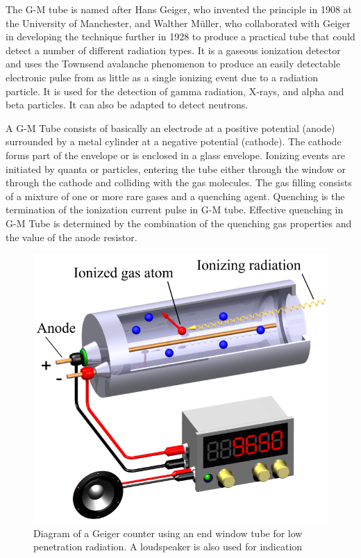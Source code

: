 \documentclass[%
 reprint,
nofootinbib,
 amsmath,amssymb,
 aps,
floatfix,
]{revtex4-2}
\begin{document}
    \par
    The G-M tube is named after Hans Geiger, who invented the principle in 1908 at the University of Manchester, and Walther M\"{u}ller, who collaborated with Geiger in developing the technique further in 1928 to produce a practical tube that could detect a number of different radiation types. It is a gaseous ionization detector and uses the Townsend avalanche phenomenon to produce an easily detectable electronic pulse from as little as a single ionizing event due to a radiation particle. It is used for the detection of gamma radiation, X-rays, and alpha and beta particles. It can also be adapted to detect neutrons.
    \par
    A G-M Tube consists of basically an electrode at a positive potential (anode) surrounded by a metal cylinder at a negative potential (cathode). The cathode forms part of the envelope or is enclosed in a glass envelope. Ionizing events are initiated by quanta or particles, entering the
    tube either through the window or through the cathode and colliding with the gas molecules. The gas filling consists of a mixture of one or more rare gases and a quenching agent. Quenching is the termination of the ionization current pulse in G-M tube. Effective quenching in G-M Tube is determined by the combination of the quenching gas properties and the value of the anode resistor.
    \begin{figure}
        \centering
        \includegraphics[scale = 0.4]{Figures/Geiger-Muller-counter-en.png}
        \caption{Diagram of a Geiger counter using an end window tube for low penetration radiation. A loudspeaker is also used for indication}
        \label{fig:maingm}
    \end{figure}
\end{document}
